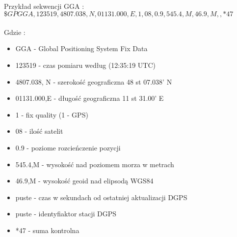 \documentclass[wide,a4paper,titlepage,12pt] {article}
\begin{document}
\paragraph{}
Przykład sekwencji GGA : \\
$\$GPGGA,123519,4807.038,N,01131.000,E,1,08,0.9,545.4,M,46.9,M,,*47$ 
\paragraph{}
Gdzie :
\begin{itemize}
	\item GGA - Global Positioning System Fix Data
	\item 123519 - czas pomiaru według (12:35:19 UTC)
	\item 4807.038, N - szerokość geograficzna 48 st 07.038' N
	\item 01131.000,E - długość geograficzna 11 st 31.00' E
	\item 1 - fix quality (1 - GPS)
	\item 08 - ilość satelit
	\item 0.9 - poziome rozcieńczenie pozycji
	\item 545.4,M - wysokość nad poziomem morza w metrach
	\item 46.9,M - wysokość geoid nad elipsodą WGS84
	\item puste -  czas w sekundach od ostatniej aktualizacji DGPS
	\item puste - identyfiaktor stacji DGPS
	\item *47 - suma kontrolna
\end{itemize}
\end{document}
